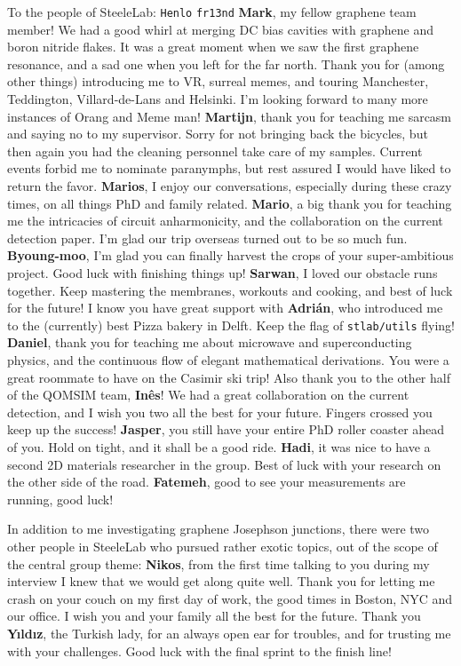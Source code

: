 To the people of SteeleLab:
%
\texttt{Henlo} \texttt{fr13nd} \textbf{Mark}, my fellow graphene team member!
%
We had a good whirl at merging DC bias cavities with graphene and boron nitride flakes.
%
It was a great moment when we saw the first graphene resonance, and a sad one when you left for the far north.
%
Thank you for (among other things) introducing me to VR, surreal memes, and touring Manchester, Teddington, Villard-de-Lans and Helsinki.
%
I'm looking forward to many more instances of Orang and Meme man!
%
\textbf{Martijn}, thank you for teaching me sarcasm and saying no to my supervisor.
%
Sorry for not bringing back the bicycles, but then again you had the cleaning personnel take care of my samples.
%
Current events forbid me to nominate paranymphs, but rest assured I would have liked to return the favor.
%
\textbf{Marios}, I enjoy our conversations, especially during these crazy times, on all things PhD and family related.
%
\textbf{Mario}, a big thank you for teaching me the intricacies of circuit anharmonicity, and the collaboration on the current detection paper.
%
I'm glad our trip overseas turned out to be so much fun.
%
\textbf{Byoung-moo}, I'm glad you can finally harvest the crops of your super-ambitious project.
%
Good luck with finishing things up!
%
\textbf{Sarwan}, I loved our obstacle runs together.
%
Keep mastering the membranes, workouts and cooking, and best of luck for the future!
%
I know you have great support with \textbf{Adrián}, who introduced me to the (currently) best Pizza bakery in Delft.
%
Keep the flag of \texttt{stlab/utils} flying!
%
\textbf{Daniel}, thank you for teaching me about microwave and superconducting physics, and the continuous flow of elegant mathematical derivations.
%
You were a great roommate to have on the Casimir ski trip!
%
Also thank you to the other half of the QOMSIM team, \textbf{Inês}!
%
We had a great collaboration on the current detection, and I wish you two all the best for your future.
%
Fingers crossed you keep up the success!
%
\textbf{Jasper}, you still have your entire PhD roller coaster ahead of you.
%
Hold on tight, and it shall be a good ride.
%
\textbf{Hadi}, it was nice to have a second 2D materials researcher in the group.
%
Best of luck with your research on the other side of the road.
%
\textbf{Fatemeh}, good to see your measurements are running, good luck!

In addition to me investigating graphene Josephson junctions, there were two other people in SteeleLab who pursued rather exotic topics, out of the scope of the central group theme:
%
\textbf{Nikos}, from the first time talking to you during my interview I knew that we would get along quite well.
%
Thank you for letting me crash on your couch on my first day of work, the good times in Boston, NYC and our office.
%
I wish you and your family all the best for the future.
%
Thank you \textbf{Yıldız}, the Turkish lady, for an always open ear for troubles, and for trusting me with your challenges.
%
Good luck with the final sprint to the finish line!

